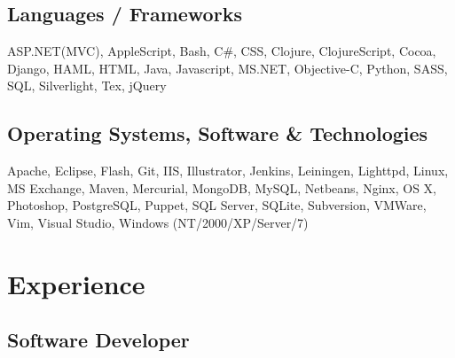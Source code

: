 \documentclass{article}
\begin{document}
\subsection*{Languages / Frameworks}
ASP.NET(MVC), AppleScript, Bash, C\#, CSS, Clojure, ClojureScript, Cocoa, Django, HAML, HTML, Java, Javascript, MS.NET, Objective-C, Python, SASS, SQL, Silverlight, Tex, jQuery
\subsection*{Operating Systems, Software \& Technologies}
Apache, Eclipse, Flash, Git, IIS, Illustrator, Jenkins, Leiningen, Lighttpd, Linux, MS Exchange, Maven, Mercurial, MongoDB, MySQL, Netbeans, Nginx, OS X, Photoshop, PostgreSQL, Puppet, SQL Server, SQLite, Subversion, VMWare, Vim, Visual Studio, Windows (NT/2000/XP/Server/7)
\section*{Experience}
\subsection*{Software Developer}
\end{document}
